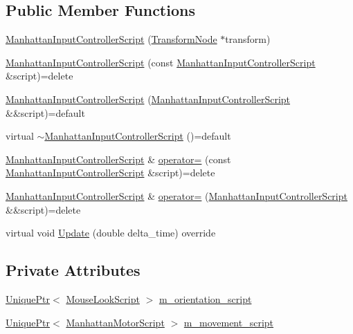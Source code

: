 \subsection*{Public Member Functions}
\begin{DoxyCompactItemize}
\item 
\hyperlink{classmage_1_1_manhattan_input_controller_script_a51b746c88210f1ca07711526cb91ec71}{Manhattan\+Input\+Controller\+Script} (\hyperlink{classmage_1_1_transform_node}{Transform\+Node} $\ast$transform)
\item 
\hyperlink{classmage_1_1_manhattan_input_controller_script_ad16da80362158de342ecf8d669fbbe15}{Manhattan\+Input\+Controller\+Script} (const \hyperlink{classmage_1_1_manhattan_input_controller_script}{Manhattan\+Input\+Controller\+Script} \&script)=delete
\item 
\hyperlink{classmage_1_1_manhattan_input_controller_script_ad17804aa997c9adb3cbecb2a6bfbfda3}{Manhattan\+Input\+Controller\+Script} (\hyperlink{classmage_1_1_manhattan_input_controller_script}{Manhattan\+Input\+Controller\+Script} \&\&script)=default
\item 
virtual \hyperlink{classmage_1_1_manhattan_input_controller_script_ae4adff57a2d77647ab0b7b89d7bda6d0}{$\sim$\+Manhattan\+Input\+Controller\+Script} ()=default
\item 
\hyperlink{classmage_1_1_manhattan_input_controller_script}{Manhattan\+Input\+Controller\+Script} \& \hyperlink{classmage_1_1_manhattan_input_controller_script_a07fdb2fee8a1eb793c2d54853c9e4998}{operator=} (const \hyperlink{classmage_1_1_manhattan_input_controller_script}{Manhattan\+Input\+Controller\+Script} \&script)=delete
\item 
\hyperlink{classmage_1_1_manhattan_input_controller_script}{Manhattan\+Input\+Controller\+Script} \& \hyperlink{classmage_1_1_manhattan_input_controller_script_acea874b94a4531c393af739824012a1a}{operator=} (\hyperlink{classmage_1_1_manhattan_input_controller_script}{Manhattan\+Input\+Controller\+Script} \&\&script)=delete
\item 
virtual void \hyperlink{classmage_1_1_manhattan_input_controller_script_adfd98377642722fae5db6e005b2c6c3e}{Update} (double delta\+\_\+time) override
\end{DoxyCompactItemize}
\subsection*{Private Attributes}
\begin{DoxyCompactItemize}
\item 
\hyperlink{namespacemage_a8c307fbcc33bce9b7f2aa4c26c3b95cf}{Unique\+Ptr}$<$ \hyperlink{classmage_1_1_mouse_look_script}{Mouse\+Look\+Script} $>$ \hyperlink{classmage_1_1_manhattan_input_controller_script_add3be278d93719ba235d4606d555bd2a}{m\+\_\+orientation\+\_\+script}
\item 
\hyperlink{namespacemage_a8c307fbcc33bce9b7f2aa4c26c3b95cf}{Unique\+Ptr}$<$ \hyperlink{classmage_1_1_manhattan_motor_script}{Manhattan\+Motor\+Script} $>$ \hyperlink{classmage_1_1_manhattan_input_controller_script_ad3b6525bba021f03c17d2de6f5e54101}{m\+\_\+movement\+\_\+script}
\end{DoxyCompactItemize}
